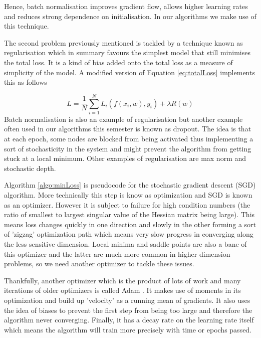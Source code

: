 \documentclass[11pt]{article} %
\begin{document}
Hence, batch normalisation improves gradient flow, allows higher learning rates and reduces strong dependence on initialisation. In our algorithms we make use of this technique.
\newline

The second problem previously mentioned is tackled by a technique known as regularisation which in summary favours the simplest model that still minimises the total loss. It is a kind of bias added onto the total loss as a measure of simplicity of the model. A modified version of Equation \ref{eq:totalLoss} implements this as follows

\begin{equation}
L = \frac{1}{N}\sum_{i=1}^{N}{L_i}(f({x_i},w),{y_i}) + \lambda R(w)
\end{equation}
Batch normalisation is also an example of regularisation but another example often used in our algorithms this semester is known as dropout. The idea is that at each epoch, some nodes are blocked from being activated thus implementing a sort of stochasticity in the system and might prevent the algorithm from getting stuck at a local minimum. Other examples of regularisation are max norm and stochastic depth.
\newline

Algorithm \ref{algo:minLoss} is pseudocode for the stochastic gradient descent (SGD) algorithm. More technically this step is know as optimization and SGD is known as an optimizer. However it is subject to failure for high condition numbers (the ratio of smallest to largest singular value of the Hessian matrix being large). This means loss changes quickly in one direction and slowly in the other forming a sort of 'zigzag' optimization path which means very slow progress in converging along the less sensitive dimension. Local minima and saddle points are also a bane of this optimizer and the latter are much more common in higher dimension problems, so we need another optimizer to tackle these issues.
\newline

Thankfully, another optimizer which is the product of lots of work and many iterations of older optimizers is called Adam \cite{kingma2014adam}. It makes use of moments in its optimization and build up 'velocity' as a running mean of gradients. It also uses the idea of biases to prevent the first step from being too large and therefore the algorithm never converging. Finally, it has a decay rate on the learning rate itself which means the algorithm will train more precisely with time or epochs passed.
\newline
\end{document}
